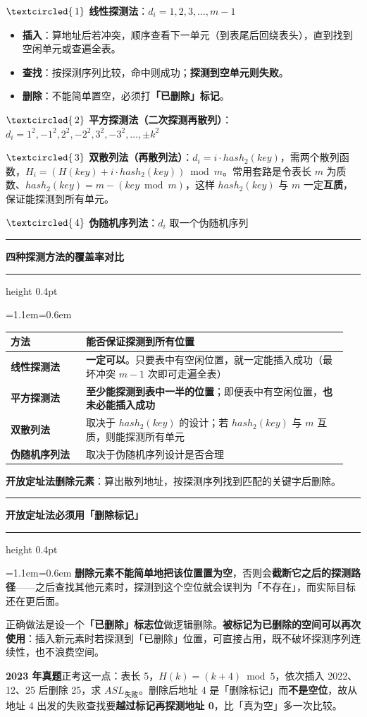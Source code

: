 \documentclass[11pt,openany,UTF8]{ctexbook}
\newcommand{\circled}[1]{\textcircled{\scriptsize\,#1}}
\newcommand{\callouthead}[2]{%
  \par\addvspace{7pt}\noindent
  {\color{#1}\rule[-0.15em]{3pt}{1.05em}}\hspace{0.5em}%
  {\bfseries\color{#1}#2}\par\nobreak\vspace{-0.35em}%
  {\color{rulesep}\hrule height 0.4pt}\nobreak\vspace{0.45em}%
  \begingroup\small\setlength{\parindent}{0pt}%
  \leftskip=1.1em\rightskip=0.6em\noindent\ignorespaces}
\newcommand{\calloutend}{\par\endgroup\addvspace{7pt}}
\newenvironment{callkey}[1]{\callouthead{keybar}{#1}}{\calloutend}
\newenvironment{callwarn}[1]{\callouthead{warnbar}{#1}}{\calloutend}
\begin{document}
\textbf{$\circled{1}$ 线性探测法}：$d_i=1,2,3,\ldots,m-1$

\begin{itemize}
\item \textbf{插入}：算地址后若冲突，顺序查看下一单元（到表尾后回绕表头），直到找到空闲单元或查遍全表。
\item \textbf{查找}：按探测序列比较，命中则成功；\textbf{探测到空单元则失败}。
\item \textbf{删除}：不能简单置空，必须打\textbf{「已删除」标记}。
\end{itemize}
\textbf{$\circled{2}$ 平方探测法（二次探测再散列）}：$d_i=1^2,-1^2,2^2,-2^2,3^2,-3^2,\ldots,\pm k^2$

\textbf{$\circled{3}$ 双散列法（再散列法）}：$d_i=i\cdot hash_2(key)$，需两个散列函数，$H_i=(H(key)+i\cdot hash_2(key))\bmod m$。常用套路是令表长 $m$ 为质数、$hash_2(key)=m-(key\bmod m)$，这样 $hash_2(key)$ 与 $m$ 一定\textbf{互质}，保证能探测到所有单元。

\textbf{$\circled{4}$ 伪随机序列法}：$d_i$ 取一个伪随机序列

\begin{callkey}{四种探测方法的覆盖率对比}
\begingroup\small\setlength{\tabcolsep}{4.0pt}
\begin{longtable}{@{}L{0.2131\linewidth}L{0.7325\linewidth}@{}}
\toprule
\textbf{方法} & \textbf{能否保证探测到所有位置} \\
\midrule
\endhead
\textbf{线性探测法} & \textbf{一定可以}。只要表中有空闲位置，就一定能插入成功（最坏冲突 $m-1$ 次即可走遍全表） \\
\textbf{平方探测法} & \textbf{至少能探测到表中一半的位置}；即便表中有空闲位置，\textbf{也未必能插入成功} \\
\textbf{双散列法} & 取决于 $hash_2(key)$ 的设计；若 $hash_2(key)$ 与 $m$ 互质，则能探测所有单元 \\
\textbf{伪随机序列法} & 取决于伪随机序列设计是否合理 \\
\bottomrule
\end{longtable}
\endgroup

\end{callkey}

\textbf{开放定址法删除元素}：算出散列地址，按探测序列找到匹配的关键字后删除。

\begin{callwarn}{开放定址法必须用「删除标记」}
\textbf{删除元素不能简单地把该位置置为空}，否则会\textbf{截断它之后的探测路径}——之后查找其他元素时，探测到这个空位就会误判为「不存在」，而实际目标还在更后面。

正确做法是设一个\textbf{「已删除」标志位}做逻辑删除。\textbf{被标记为已删除的空间可以再次使用}：插入新元素时若探测到「已删除」位置，可直接占用，既不破坏探测序列连续性，也不浪费空间。

\textbf{2023 年真题}正考这一点：表长 5，$H(k)=(k+4)\bmod 5$，依次插入 2022、12、25 后删除 25，求 $ASL_{失败}$。删除后地址 4 是「删除标记」而\textbf{不是空位}，故从地址 4 出发的失败查找要\textbf{越过标记再探测地址 0}，比「真为空」多一次比较。

\end{callwarn}
\end{document}
